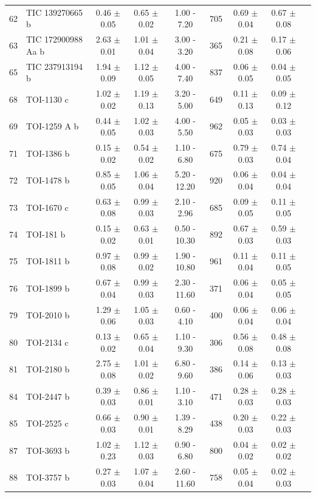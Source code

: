 \begin{longtable}{llccccccc}
62 & TIC 139270665 b & 0.46 $\pm$ 0.05 & 0.65 $\pm$ 0.02 & 1.00 - 7.20 & 705 & 0.69 $\pm$ 0.04 & 0.67 $\pm$ 0.08 \\
63 & TIC 172900988 Aa b & 2.63 $\pm$ 0.01 & 1.01 $\pm$ 0.04 & 3.00 - 3.20 & 365 & 0.21 $\pm$ 0.08 & 0.17 $\pm$ 0.06 \\
65 & TIC 237913194 b & 1.94 $\pm$ 0.09 & 1.12 $\pm$ 0.05 & 4.00 - 7.40 & 837 & 0.06 $\pm$ 0.05 & 0.04 $\pm$ 0.05 \\
68 & TOI-1130 c & 1.02 $\pm$ 0.02 & 1.19 $\pm$ 0.13 & 3.20 - 5.00 & 649 & 0.11 $\pm$ 0.13 & 0.09 $\pm$ 0.12 \\
69 & TOI-1259 A b & 0.44 $\pm$ 0.05 & 1.02 $\pm$ 0.03 & 4.00 - 5.50 & 962 & 0.05 $\pm$ 0.03 & 0.03 $\pm$ 0.03 \\
71 & TOI-1386 b & 0.15 $\pm$ 0.02 & 0.54 $\pm$ 0.02 & 1.10 - 6.80 & 675 & 0.79 $\pm$ 0.03 & 0.74 $\pm$ 0.04 \\
72 & TOI-1478 b & 0.85 $\pm$ 0.05 & 1.06 $\pm$ 0.04 & 5.20 - 12.20 & 920 & 0.06 $\pm$ 0.04 & 0.04 $\pm$ 0.04 \\
73 & TOI-1670 c & 0.63 $\pm$ 0.08 & 0.99 $\pm$ 0.03 & 2.10 - 2.96 & 685 & 0.09 $\pm$ 0.05 & 0.11 $\pm$ 0.05 \\
74 & TOI-181 b & 0.15 $\pm$ 0.02 & 0.63 $\pm$ 0.01 & 0.50 - 10.30 & 892 & 0.67 $\pm$ 0.03 & 0.59 $\pm$ 0.03 \\
75 & TOI-1811 b & 0.97 $\pm$ 0.08 & 0.99 $\pm$ 0.02 & 1.90 - 10.80 & 961 & 0.11 $\pm$ 0.04 & 0.11 $\pm$ 0.05 \\
76 & TOI-1899 b & 0.67 $\pm$ 0.04 & 0.99 $\pm$ 0.03 & 2.30 - 11.60 & 371 & 0.06 $\pm$ 0.04 & 0.05 $\pm$ 0.05 \\
79 & TOI-2010 b & 1.29 $\pm$ 0.06 & 1.05 $\pm$ 0.03 & 0.60 - 4.10 & 400 & 0.06 $\pm$ 0.04 & 0.06 $\pm$ 0.04 \\
80 & TOI-2134 c & 0.13 $\pm$ 0.02 & 0.65 $\pm$ 0.04 & 1.10 - 9.30 & 306 & 0.56 $\pm$ 0.08 & 0.48 $\pm$ 0.08 \\
81 & TOI-2180 b & 2.75 $\pm$ 0.08 & 1.01 $\pm$ 0.02 & 6.80 - 9.60 & 386 & 0.14 $\pm$ 0.06 & 0.13 $\pm$ 0.03 \\
84 & TOI-2447 b & 0.39 $\pm$ 0.03 & 0.86 $\pm$ 0.01 & 1.10 - 3.10 & 471 & 0.28 $\pm$ 0.03 & 0.28 $\pm$ 0.03 \\
85 & TOI-2525 c & 0.66 $\pm$ 0.03 & 0.90 $\pm$ 0.01 & 1.39 - 8.29 & 438 & 0.20 $\pm$ 0.03 & 0.22 $\pm$ 0.03 \\
87 & TOI-3693 b & 1.02 $\pm$ 0.23 & 1.12 $\pm$ 0.03 & 0.90 - 6.80 & 800 & 0.04 $\pm$ 0.02 & 0.02 $\pm$ 0.02 \\
88 & TOI-3757 b & 0.27 $\pm$ 0.03 & 1.07 $\pm$ 0.04 & 2.60 - 11.60 & 758 & 0.05 $\pm$ 0.04 & 0.02 $\pm$ 0.03 \\

\end{longtable}
